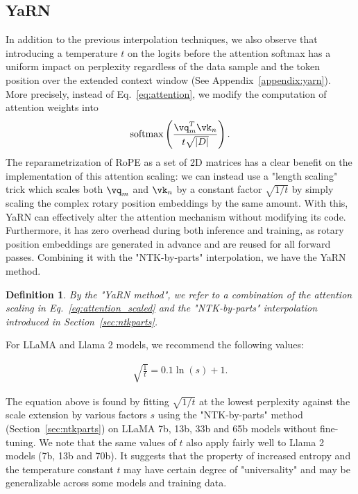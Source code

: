 \documentclass{article} %
\newtheorem{definition}{Definition}
\begin{document}
\subsection{YaRN}\label{sec:yarn}

In addition to the previous interpolation techniques, we also observe that introducing a temperature $t$ on the logits before the attention softmax has a uniform impact on perplexity regardless of the data sample and the token position over the extended context window (See Appendix~\ref{appendix:yarn}). More precisely, instead of Eq.~\ref{eq:attention}, we modify the computation of attention weights into
\begin{equation}\label{eq:attention_scaled}
\text{softmax}\left(\dfrac{\vq_m^T\vk_n}{t\sqrt{|D|}}\right).
\end{equation}
The reparametrization of RoPE as a set of 2D matrices has a clear benefit on the implementation of this attention scaling:  we can instead use a "length scaling" trick which scales both $\vq_m$ and $\vk_n$ by a constant factor $\sqrt{1/t}$ by simply scaling the complex rotary position embeddings by the same amount. With this, YaRN can effectively alter the attention mechanism without modifying its code. Furthermore, it has zero overhead during both inference and training, as rotary position embeddings are generated in advance and are reused for all forward passes. Combining it with the "NTK-by-parts" interpolation, we have the YaRN method.


\begin{definition}
    By the "YaRN method", we refer to a combination of the attention scaling in Eq.~\ref{eq:attention_scaled} and the "NTK-by-parts" interpolation introduced in Section~\ref{sec:ntkparts}.
\end{definition}

For LLaMA and Llama 2 models, we recommend the following values:

\begin{align}\label{eq:yarn_t}
    \sqrt{\frac{1}{t}} = 0.1 \ln({s}) + 1.
\end{align}

The equation above is found by fitting $\sqrt{1/t}$ at the lowest perplexity against the scale extension by various factors $s$ using the "NTK-by-parts" method (Section~\ref{sec:ntkparts}) on LLaMA 7b, 13b, 33b and 65b models without fine-tuning. We note that the same values of $t$ also apply fairly well to Llama 2 models (7b, 13b and 70b). It suggests that the property of increased entropy and the temperature constant $t$ may have certain degree of "universality" and may be generalizable across some models and training data.
\end{document}
